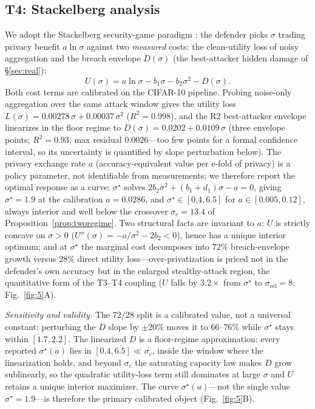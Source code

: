 \documentclass[final,1p,times]{elsarticle}
\begin{document}
\subsection{T4: Stackelberg analysis}
We adopt the Stackelberg security-game paradigm
\cite{tambe2011security}: the defender picks $\sigma$ trading privacy benefit $a\ln\sigma$
against two \emph{measured} costs: the clean-utility loss of noisy
aggregation and the breach envelope $D(\sigma)$ (the best-attacker
hidden damage of \S\ref{sec:real}):
\begin{equation}
  U(\sigma)=a\ln\sigma-b_1\sigma-b_2\sigma^2-D(\sigma).
\end{equation}
Both cost terms are calibrated on the CIFAR-10 pipeline. Probing
noise-only aggregation over the same attack window gives the utility
loss $L(\sigma)=0.00278\,\sigma+0.00037\,\sigma^2$ ($R^2=0.998$), and
the R2 best-attacker envelope linearizes in the
floor regime to $D(\sigma)=0.0202+0.0109\,\sigma$ (three envelope
points; $R^2=0.93$, max residual $0.0026$---too few points for a formal
confidence interval, so its uncertainty is quantified by slope
perturbation below). The privacy
exchange rate $a$
(accuracy-equivalent value per e-fold of privacy) is a policy
parameter, not identifiable from measurements; we therefore report the
optimal response as a curve: $\sigma^\star$ solves
$2b_2\sigma^2+(b_1+d_1)\sigma-a=0$, giving $\sigma^\star=1.9$ at the
calibration $a=0.0286$, and $\sigma^\star\in[0.4,6.5]$ for
$a\in[0.005,0.12]$, always interior and well below the
crossover $\sigma_c=13.4$ of Proposition~\ref{prop:tworegime}.
Two structural facts are invariant to $a$: $U$ is strictly
concave on $\sigma>0$ ($U''(\sigma)=-a/\sigma^{2}-2b_{2}<0$), hence has
a unique interior optimum; and at $\sigma^\star$ the marginal
cost decomposes into $72\%$ breach-envelope growth versus $28\%$
direct utility loss---over-privatization is priced not in the
defender's own accuracy but in the enlarged stealthy-attack region,
the quantitative form of the T3--T4 coupling ($U$ falls by $3.2\times$
from $\sigma^\star$ to $\sigma_{\mathrm{rel}}{=}8$;
Fig.~\ref{fig:5}A).

\emph{Sensitivity and validity.} The $72/28$ split is a calibrated
value, not a universal constant: perturbing the $D$ slope by
$\pm20\%$ moves it to $66$--$76\%$ while $\sigma^\star$ stays within
$[1.7,2.2]$. The linearized $D$ is a floor-regime approximation: every
reported $\sigma^\star(a)$ lies in $[0.4,6.5]\ll\sigma_c$, inside the
window where the linearization holds, and beyond $\sigma_c$ the
saturating capacity law makes $D$ grow sublinearly, so the quadratic
utility-loss term still dominates at large $\sigma$ and $U$ retains a
unique interior maximizer. The curve $\sigma^\star(a)$---not the single
value $\sigma^\star{=}1.9$---is therefore the primary calibrated object
(Fig.~\ref{fig:5}B).
\end{document}
